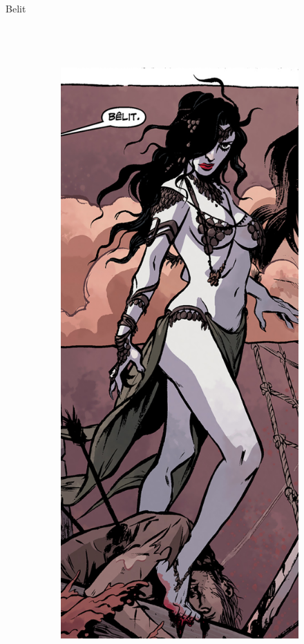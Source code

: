 \begin{frame}{Belit}
\begin{columns}
\begin{figure}[htp]
\begin{subfigure}[b]{0.3\textwidth}
			\end{subfigure}
			~
			\begin{subfigure}[b]{0.27\textwidth}
				\includegraphics[width=\textwidth]{img/belit/DH}

\end{subfigure}
\end{figure}
\end{columns}
\end{frame}
